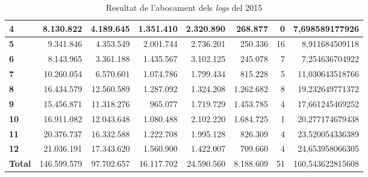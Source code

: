 \begin{table}[h!]
\begin{adjustbox}{width=1.2\textwidth, center}
\begin{tabular}{|l|r|r|r|r|r|r|r|}
            \textbf{4}     & 8.130.822   & 4.189.645  & 1.351.410  & 2.320.890  & 268.877   & 0  & 7,698589177926   \\
            \midrule
            \textbf{5}     & 9.341.846   & 4.353.549  & 2.001.744  & 2.736.201  & 250.336   & 16 & 8,911684509118   \\
            \textbf{6}     & 8.143.965   & 3.361.188  & 1.435.567  & 3.102.125  & 245.078   & 7  & 7,254636704922   \\
            \textbf{7}     & 10.260.054  & 6.570.601  & 1.074.786  & 1.799.434  & 815.228   & 5  & 11,030643518766  \\
            \textbf{8}     & 16.434.579  & 12.560.589 & 1.287.092  & 1.324.208  & 1.262.682 & 8  & 19,232649771372  \\
            \midrule
            \textbf{9}     & 15.456.871  & 11.318.276 & 965.077    & 1.719.729  & 1.453.785 & 4  & 17,661245469252  \\
            \textbf{10}    & 16.911.082  & 12.043.648 & 1.080.488  & 2.102.220  & 1.684.725 & 1  & 20,277174679438  \\
            \textbf{11}    & 20.376.737  & 16.332.588 & 1.222.708  & 1.995.128  & 826.309   & 4  & 23,520054336389  \\
            \textbf{12}    & 21.036.191  & 17.343.620 & 1.560.900  & 1.422.007  & 709.660   & 4  & 24,653958066305  \\
            \midrule
            \textbf{Total} & 146.599.579 & 97.702.657 & 16.117.702 & 24.590.560 & 8.188.609 & 51 & 160,543622815608 \\
            \bottomrule
        \end{tabular}
    \end{adjustbox}
    \caption{Resultat de l'abocament dels \textit{logs} del 2015}
    \label{tab:logs-table-2015}
\end{table}
